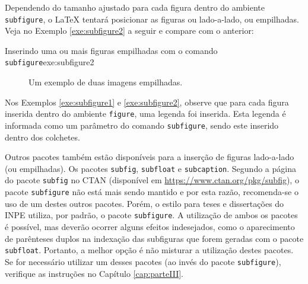 Dependendo do tamanho ajustado para cada figura dentro do ambiente {\tt subfigure}, o \LaTeX{} tentará posicionar as figuras ou lado-a-lado, ou empilhadas. Veja no Exemplo \ref{exe:subfigure2} a seguir e compare com o anterior:

\begin{texexptitled}[breakable,enhanced,middle=2mm]{Inserindo uma ou mais figuras empilhadas com o comando {\tt subfigure}}{exe:subfigure2}
\begin{figure}[H]
    \begin{center}
        \caption{Um exemplo de duas imagens empilhadas.}
    \end{center}
\end{figure}
\end{texexptitled}

Nos Exemplos \ref{exe:subfigure1} e \ref{exe:subfigure2}, observe que para cada figura inserida dentro do ambiente {\tt figure}, uma legenda foi inserida. Esta legenda é informada como um parâmetro do comando {\tt subfigure}, sendo este inserido dentro dos colchetes. 


Outros pacotes também estão disponíveis para a inserção de figuras lado-a-lado (ou empilhadas). Os pacotes {\tt subfig}, {\tt subfloat} e {\tt subcaption}. Segundo a página do pacote {\tt subfig} no CTAN (disponível em \url{https://www.ctan.org/pkg/subfig}), o pacote {\tt subfigure} não está mais sendo mantido e por esta razão, recomenda-se o uso de um destes outros pacotes. Porém, o estilo para teses e dissertações do INPE utiliza, por padrão, o pacote {\tt subfigure}. A utilização de ambos os pacotes é possível, mas deverão ocorrer alguns efeitos indesejados, como o aparecimento de parênteses duplos na indexação das subfiguras que forem geradas com o pacote {\tt subfloat}. Portanto, a melhor opção é não misturar a utilização destes pacotes. Se for necessário utilizar um desses pacotes (ao invés do pacote {\tt subfigure}), verifique as instruções no Capítulo \ref{cap:parteIII}. 

